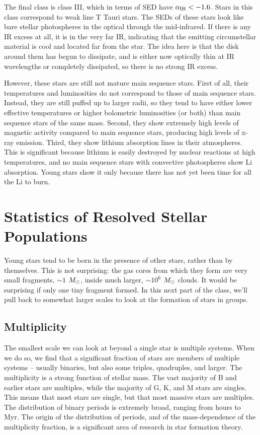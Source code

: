 The final class is class III, which in terms of SED have $\alpha_{\rm IR} < -1.6$. Stars in this class correspond to weak line T Tauri stars. The SEDs of these stars look like bare stellar photospheres in the optical through the mid-infrared. If there is any IR excess at all, it is in the very far IR, indicating that the emitting circumstellar material is cool and located far from the star. The idea here is that the disk around them has begun to dissipate, and is either now optically thin at IR wavelengths or completely dissipated, so there is no strong IR excess. 

However, these stars are still not mature main sequence stars. First of all, their temperatures and luminosities do not correspond to those of main sequence stars. Instead, they are still puffed up to larger radii, so they tend to have either lower effective temperatures or higher bolometric luminosities (or both) than main sequence stars of the same mass. Second, they show extremely high levels of magnetic activity compared to main sequence stars, producing high levels of x-ray emission. Third, they show lithium absorption lines in their atmospheres. This is significant because lithium is easily destroyed by nuclear reactions at high temperatures, and no main sequence stars with convective photospheres show Li absorption. Young stars show it only because there has not yet been time for all the Li to burn.

\section{Statistics of Resolved Stellar Populations}

Young stars tend to be born in the presence of other stars, rather than by themselves. This is not surprising: the gas cores from which they form are very small fragments, $\sim 1$ $M_{\odot}$, inside much larger, $\sim 10^6$ $M_{\odot}$ clouds. It would be surprising if only one tiny fragment formed. In this next part of the class, we'll pull back to somewhat larger scales to look at the formation of stars in groups.

\subsection{Multiplicity}

The smallest scale we can look at beyond a single star is multiple systems. When we do so, we find that a significant fraction of stars are members of multiple systems -- usually binaries, but also some triples, quadruples, and larger. The multiplicity is a strong function of stellar mass. The vast majority of B and earlier stars are multiples, while the majority of G, K, and M stars are singles. This means that most stars are single, but that most massive stars are multiples. The distribution of binary periods is extremely broad, ranging from hours to Myr. The origin of the distribution of periods, and of the mass-dependence of the multiplicity fraction, is a significant area of research in star formation theory.

